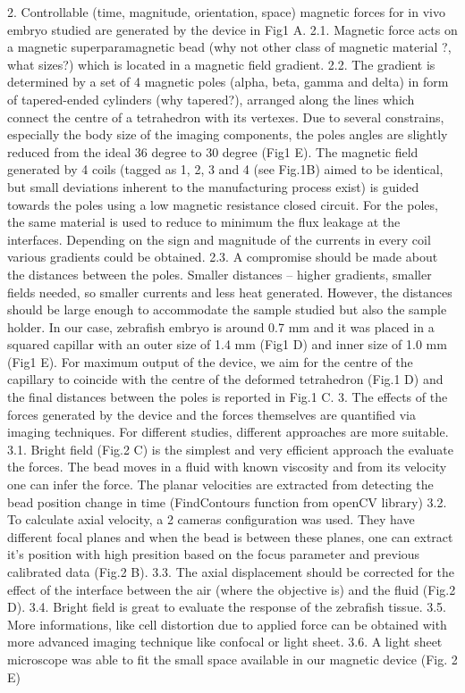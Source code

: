     2. Controllable (time, magnitude, orientation, space) magnetic forces for in vivo embryo studied are generated by the device in Fig1 A.
    2.1. Magnetic force acts on a magnetic superparamagnetic bead (why not other class of magnetic material ?, what sizes?) which is located in a magnetic field gradient.
    2.2. The gradient is determined by a set of 4 magnetic poles (alpha, beta, gamma and delta) in form of tapered-ended cylinders (why tapered?),  arranged along the lines which connect the centre of a tetrahedron with its vertexes. Due to several constrains, especially the body size of the imaging components, the poles angles are slightly reduced from the ideal 36 degree to 30 degree (Fig1 E). The magnetic field generated by 4 coils (tagged as 1, 2, 3 and 4 (see Fig.1B) aimed to be identical, but small deviations inherent to the manufacturing process exist) is guided towards the poles using a low magnetic resistance closed circuit. For the poles, the same material is used to reduce to minimum the flux leakage at the interfaces. Depending on the sign and magnitude of the currents in every coil various gradients could be obtained.
    2.3. A compromise should be made about the distances between the poles. Smaller distances – higher gradients, smaller fields needed, so smaller currents and less heat generated. However, the distances should be large enough to accommodate the sample studied but also the sample holder. In our case, zebrafish embryo is around 0.7 mm and it was placed in a squared capillar with an outer size of 1.4 mm (Fig1 D) and inner size of 1.0 mm (Fig1 E). For maximum output of the device, we aim for the centre of the capillary to coincide with the centre of the deformed tetrahedron (Fig.1 D) and the final distances between the poles is reported in Fig.1 C.
    3. The effects of the forces generated by the device and the forces themselves are quantified via imaging techniques. For different studies, different approaches are more suitable.
    3.1. Bright field (Fig.2 C) is the simplest and very efficient approach the evaluate the forces. The bead moves in a fluid with known viscosity and from its velocity one can infer the force. The planar velocities are extracted from detecting the bead position change in time (FindContours function from openCV library)
    3.2. To calculate axial velocity, a 2 cameras configuration was used. They have different focal planes and when the bead is between these planes, one can extract it’s position with high presition based on the focus parameter and previous calibrated data (Fig.2 B).
    3.3. The axial displacement should be corrected for the effect of the interface between the air (where the objective is) and the fluid (Fig.2 D).
    3.4. Bright field is great to evaluate the response of the zebrafish tissue.
    3.5. More informations, like cell distortion due to applied force can be obtained with more advanced imaging technique like confocal or light sheet.
    3.6. A light sheet microscope was able to fit the small space available in our magnetic device (Fig. 2 E)

